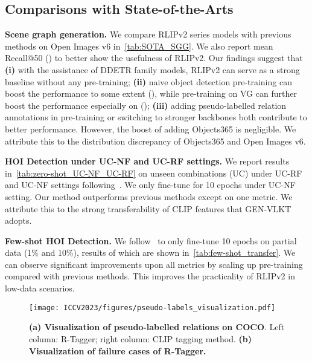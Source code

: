 \subsection{Comparisons with State-of-the-Arts}


\textbf{Scene graph generation.}
We compare RLIPv2 series models with previous methods on Open Images v6 in~\cref{tab:SOTA_SGG}.
We also report mean Recall@50 () to better show the usefulness of RLIPv2.
Our findings suggest that
\textbf{(i)} with the assistance of DDETR family models, RLIPv2 can serve as a strong baseline without any pre-training;
\textbf{(ii)} naive object detection pre-training can boost the performance to some extent (), while pre-training on VG can further boost the performance especially on  ();
\textbf{(iii)} adding pseudo-labelled relation annotations in pre-training or switching to stronger backbones both contribute to better performance.
However, the boost of adding Objects365 is negligible.
We attribute this to the distribution discrepancy of Objects365 and Open Images v6.



\textbf{HOI Detection under UC-NF and UC-RF settings.}
We report results in~\cref{tab:zero-shot_UC-NF_UC-RF} on unseen combinations (UC) under UC-RF and UC-NF settings following~\cite{hou2020VCL,hou2021ATL}.
We only fine-tune for 10 epochs under UC-NF setting.
Our method outperforms previous methods except on one metric.
We attribute this to the strong transferability of CLIP features that GEN-VLKT adopts.

\textbf{Few-shot HOI Detection.} 
We follow~\cite{Yuan2022RLIP} to only fine-tune 10 epochs on partial data (1\% and 10\%), results of which are shown in~\cref{tab:few-shot_transfer}.
We can observe significant improvements upon all metrics by scaling up pre-training compared with previous methods.
This improves the practicality of RLIPv2 in low-data scenarios.

\begin{figure}[t]
\centering
\vspace{-0.4cm}
\texttt{[image: ICCV2023/figures/pseudo-labels\_visualization.pdf]}
\vspace{-0.2cm}
\caption{\small \textbf{(a) Visualization of pseudo-labelled relations on COCO}. Left column: R-Tagger; right column: CLIP tagging method. \textbf{(b) Visualization of failure cases of R-Tagger.}}
\vspace{-0.4cm}
\label{fig:pseudo-labels_visualization}
\end{figure}



